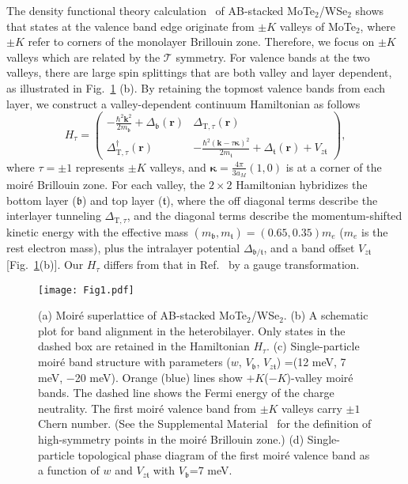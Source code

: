 \documentclass[aps,prl,twocolumn,superscriptaddress,longbibliography]{revtex4-2}
\begin{document}
The density functional theory calculation~\cite{zhang2021spintextured,li2021quantum} of AB-stacked MoTe$_2$/WSe$_2$ shows that states at the valence band edge originate from $\pm K$ valleys of MoTe$_2$, where $\pm K$ refer to corners of the monolayer Brillouin zone. Therefore, we focus on $\pm K$ valleys which are related by the $\mathcal{T}$ symmetry. For valence bands at the two valleys, there are large spin splittings that are both valley and layer dependent, as illustrated in Fig.~\ref{fig:1} (b).  By retaining the topmost valence bands from each layer, we construct \cite{wu2019topological,pan2020band,zhang2021spintextured} a valley-dependent continuum Hamiltonian as follows  
\begin{equation}\label{eq:Ham}
    H_{\tau}=\begin{pmatrix}
        -\frac{\hbar^2\bm{k}^2}{2m_\mathfrak{b}}+\Delta_{\mathfrak{b}}(\bm{r}) &  \Delta_{\text{T},\tau}(\bm{r})\\
        \Delta_{\text{T},\tau}^\dag(\bm{r}) & -\frac{\hbar^2\left(\bm{k}-\tau \bm{\kappa}\right)^2}{2m_\mathfrak{t}}+ \Delta_\mathfrak{t}(\bm{r})+V_{z\mathfrak{t}}
    \end{pmatrix},
\end{equation} 
where $\tau=\pm 1$ represents $\pm K$ valleys, and $\bm{\kappa}=\frac{4\pi}{3a_M}\left(1,0\right)$  is at a corner of the  moir\'e Brillouin zone.  For each valley, the $2\times 2$ Hamiltonian hybridizes the bottom layer ($\mathfrak{b}$) and top layer ($\mathfrak{t}$), where the off diagonal terms describe the interlayer tunneling $\Delta_{\text{T},\tau}$, and the diagonal terms describe the momentum-shifted kinetic energy with the effective mass $(m_{\mathfrak{b}},m_{\mathfrak{t}})=(0.65,0.35)m_e$ ($m_e$ is the rest electron mass), plus the intralayer potential $\Delta_{\mathfrak{b}/\mathfrak{t}}$, and a band offset $V_{z\mathfrak{t}}$ [Fig.~\ref{fig:1}(b)]. Our $H_\tau$ differs from that in Ref.~ by a gauge transformation. 

\begin{figure}[t]
    \centering
    \texttt{[image: Fig1.pdf]}
    \caption{(a) Moir\'e superlattice of AB-stacked MoTe$_2$/WSe$_2$. (b) A schematic plot for band alignment in the heterobilayer. Only states in the dashed box are retained in the Hamiltonian $H_\tau$. (c) Single-particle moir\'e band structure with parameters ($w$, $V_\mathfrak{b}$, $V_{z\mathfrak{t}}$) =(12 meV, 7 meV, $-$20 meV). Orange (blue) lines show $+K$($-K$)-valley moir\'e bands. {The dashed line shows the Fermi energy of the charge neutrality.} The first moir\'e valence band from $\pm K$ valleys carry $\pm 1$ Chern number. {(See the Supplemental Material~\cite{HeteroBilayer_SM}\cite*{wu2020quantum, fukui2005chern, monkhorst1976special} for the definition of high-symmetry points in the moir\'e Brillouin zone.)} (d) Single-particle topological phase diagram of the first moir\'e valence band as a function of $w$ and $V_{z\mathfrak{t}}$ with $V_\mathfrak{b}$=7 meV.}
    \label{fig:1}
\end{figure}
\end{document}
